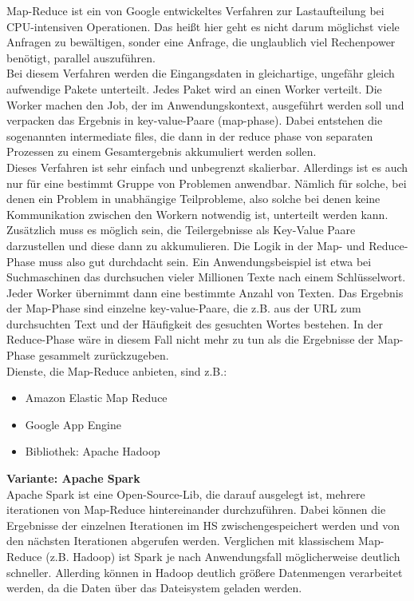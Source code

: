 Map-Reduce ist ein von Google entwickeltes Verfahren zur Lastaufteilung bei CPU-intensiven Operationen. Das heißt hier geht es nicht darum möglichst viele Anfragen zu bewältigen, sonder eine Anfrage, die unglaublich viel Rechenpower benötigt, parallel auszuführen.\\
Bei diesem Verfahren werden die Eingangsdaten in gleichartige, ungefähr gleich aufwendige Pakete unterteilt. Jedes Paket wird an einen Worker verteilt. Die Worker machen den Job, der im Anwendungskontext, ausgeführt werden soll und verpacken das Ergebnis in key-value-Paare (map-phase). Dabei entstehen die sogenannten intermediate files, die dann in der reduce phase von separaten Prozessen zu einem Gesamtergebnis akkumuliert werden sollen.\\
Dieses Verfahren ist sehr einfach und unbegrenzt skalierbar. Allerdings ist es auch nur für eine bestimmt Gruppe von Problemen anwendbar. Nämlich für solche, bei denen ein Problem in unabhängige Teilprobleme, also solche bei denen keine Kommunikation zwischen den Workern notwendig ist, unterteilt werden kann. Zusätzlich muss es möglich sein, die Teilergebnisse als Key-Value Paare darzustellen und diese dann zu akkumulieren. Die Logik in der Map- und Reduce-Phase muss also gut durchdacht sein. Ein Anwendungsbeispiel ist etwa bei Suchmaschinen das durchsuchen vieler Millionen Texte nach einem Schlüsselwort. Jeder Worker übernimmt dann eine bestimmte Anzahl von Texten. Das Ergebnis der Map-Phase sind einzelne key-value-Paare, die z.B. aus der URL zum durchsuchten Text und der Häufigkeit des gesuchten Wortes bestehen. In der Reduce-Phase wäre in diesem Fall nicht mehr zu tun als die Ergebnisse der Map-Phase gesammelt zurückzugeben.\\

Dienste, die Map-Reduce anbieten, sind z.B.:
\begin{itemize}
    \item Amazon Elastic Map Reduce
    \item Google App Engine
    \item Bibliothek: Apache Hadoop
\end{itemize}

\textbf{Variante: Apache Spark}\\
Apache Spark ist eine Open-Source-Lib, die darauf ausgelegt ist, mehrere iterationen von Map-Reduce hintereinander durchzuführen. Dabei können die Ergebnisse der einzelnen Iterationen im HS zwischengespeichert werden und von den nächsten Iterationen abgerufen werden. Verglichen mit klassischem Map-Reduce (z.B. Hadoop) ist Spark je nach Anwendungsfall möglicherweise deutlich schneller. Allerding können in Hadoop deutlich größere Datenmengen verarbeitet werden, da die Daten über das Dateisystem geladen werden.


